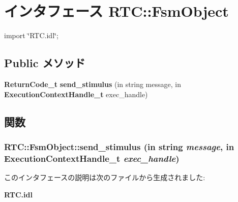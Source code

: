 \section{インタフェース RTC::FsmObject}
\label{interfaceRTC_1_1FsmObject}


{\ttfamily import \char`\"{}RTC.idl\char`\"{};}

\subsection*{Public メソッド}
\begin{DoxyCompactItemize}
\item 
{\bf ReturnCode\_\-t} {\bf send\_\-stimulus} (in string message, in {\bf ExecutionContextHandle\_\-t} exec\_\-handle)
\end{DoxyCompactItemize}


\subsection{関数}
\subsubsection[{send\_\-stimulus}]{ RTC::FsmObject::send\_\-stimulus (in string {\em message}, \/  in {\bf ExecutionContextHandle\_\-t} {\em exec\_\-handle})}\label{interfaceRTC_1_1FsmObject_a6c374a4be4ef1824feced8825dfe7a25}


このインタフェースの説明は次のファイルから生成されました:\begin{DoxyCompactItemize}
\item 
{\bf RTC.idl}\end{DoxyCompactItemize}
